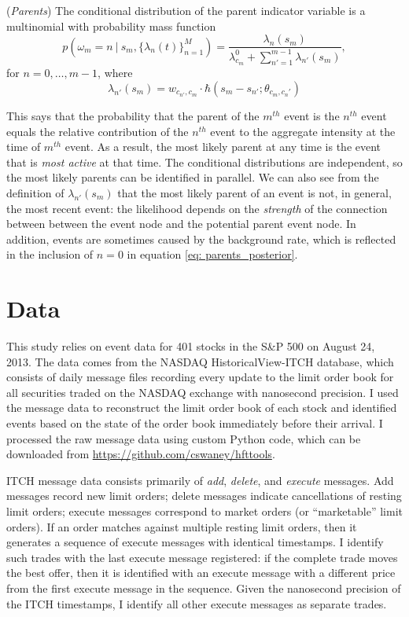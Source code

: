 (\textit{Parents}) The conditional distribution of the parent indicator variable is a multinomial with probability mass function
\begin{equation} \label{eq: parents_posterior}
	p(\omega_m = n \ | \ s_m, \{ \lambda_n(t)\}_{n=1}^M) = \frac{\lambda_n(s_m)}{\lambda_{c_m}^0 + \sum_{n'=1}^{m - 1} \lambda_{n'}(s_m)},
\end{equation}
for $n = 0, \dots, m - 1$, where
\begin{equation}
	\lambda_{n'}(s_m) = w_{c_{n'},c_m} \cdot \hbar(s_m - s_{n'}; \theta_{c_m,c_n'})
\end{equation}

This says that the probability that the parent of the $m^{th}$ event is the $n^{th}$ event equals the relative contribution of the $n^{th}$ event to the aggregate intensity at the time of $m^{th}$ event. As a result, the most likely parent at any time is the event that is \textit{most active} at that time. The conditional distributions are independent, so the most likely parents can be identified in parallel. We can also see from the definition of $\lambda_{n'}(s_m)$ that the most likely parent of an event is not, in general, the most recent event: the likelihood depends on the \textit{strength} of the connection between between the event node and the potential parent event node. In addition, events are sometimes caused by the background rate, which is reflected in the inclusion of $n=0$ in equation \eqref{eq: parents_posterior}.


\section{Data}
This study relies on event data for 401 stocks in the S\&P 500 on August 24, 2013. The data comes from the NASDAQ HistoricalView-ITCH database, which consists of daily message files recording every update to the limit order book for all securities traded on the NASDAQ exchange with nanosecond precision. I used the message data to reconstruct the limit order book of each stock and identified events based on the state of the order book immediately before their arrival. I processed the raw message data using custom Python code, which can be downloaded from \url{https://github.com/cswaney/hfttools}.

ITCH message data consists primarily of \textit{add}, \textit{delete}, and \textit{execute} messages. Add messages record new limit orders; delete messages indicate cancellations of resting limit orders; execute messages correspond to market orders (or ``marketable'' limit orders). If an order matches against multiple resting limit orders, then it generates a sequence of execute messages with identical timestamps. I identify such trades with the last execute message registered: if the complete trade moves the best offer, then it is identified with an execute message with a different price from the first execute message in the sequence. Given the nanosecond precision of the ITCH timestamps, I identify all other execute messages as separate trades.

